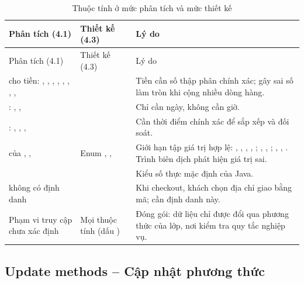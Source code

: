 \documentclass[12pt,a4paper]{article}
\begin{document}
\begin{longtable}{@{}P{3.4cm}P{3.8cm}P{8.7cm}@{}}
\caption{Thuộc tính ở mức phân tích và mức thiết kế}\label{tab:attrs}\\
\toprule
Phân tích (4.1) & Thiết kế (4.3) & Lý do\\
\midrule
\endfirsthead
\toprule
Phân tích (4.1) & Thiết kế (4.3) & Lý do\\
\midrule
\endhead
\small{} cho tiền: , , , , , , , ,  & \small{} & \small Tiền cần số thập phân chính xác;  gây sai số làm tròn khi cộng nhiều dòng hàng.\\
\small{}: , ,  & \small{} & \small Chỉ cần ngày, không cần giờ.\\
\small{}: , , ,  & \small{} & \small Cần thời điểm chính xác để sắp xếp và đối soát.\\
\small{} của , ,  & \small Enum , ,  & \small Giới hạn tập giá trị hợp lệ: , , , , ; , , ; , , . Trình biên dịch phát hiện giá trị sai.\\
\small{} & \small{} & \small Kiểu số thực mặc định của Java.\\
\small {} không có định danh & \small {} & \small Khi checkout, khách chọn địa chỉ giao bằng mã;  cần định danh này.\\
\small Phạm vi truy cập chưa xác định & \small Mọi thuộc tính  (dấu \code{-}) & \small Đóng gói: dữ liệu chỉ được đổi qua phương thức của lớp, nơi kiểm tra quy tắc nghiệp vụ.\\
\bottomrule
\end{longtable}

\subsection{Update methods -- Cập nhật phương thức}
\end{document}
